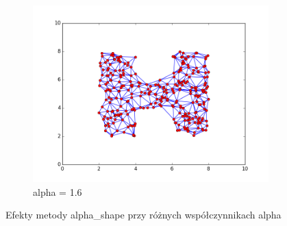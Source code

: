 \begin{figure}[h!]
\begin{subfigure}[b]{0.33\textwidth}
		\includegraphics[width=\linewidth]{img/triangulacja3.png}
		\caption {alpha = 1.6}
	\end{subfigure}
    \caption{Efekty metody alpha\_shape przy różnych współczynnikach alpha}
    \label{fig:triangulacja_alpha}
\end{figure}

